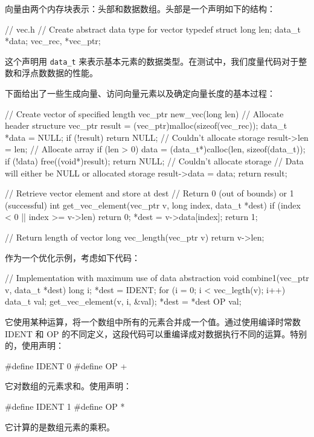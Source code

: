 向量由两个内存块表示：头部和数据数组。头部是一个声明如下的结构：

\begin{cppcode}
// vec.h
// Create abstract data type for vector
typedef struct {
  long len;
  data_t *data;
} vec_rec, *vec_ptr;
\end{cppcode}

这个声明用 \verb|data_t| 来表示基本元素的数据类型。在测试中，我们度量代码对于整数和浮点数数据的性能。

下面给出了一些生成向量、访问向量元素以及确定向量长度的基本过程：

\begin{cppcode}
// Create vector of specified length
vec_ptr new_vec(long len) {
  // Allocate header structure
  vec_ptr result = (vec_ptr)malloc(sizeof(vec_rec));
  data_t *data = NULL;
  if (!result) return NULL; // Couldn't allocate storage
  result->len = len;
  // Allocate array
  if (len > 0) {
    data = (data_t*)calloc(len, sizeof(data_t));
    if (!data) {
      free((void*)result);
      return NULL; // Couldn't allocate storage
    }
  }
  // Data will either be NULL or allocated storage
  result->data = data;
  return result;
}

// Retrieve vector element and store at dest
// Return 0 (out of bounds) or 1 (successful)
int get_vec_element(vec_ptr v, long index, data_t *dest) {
  if (index < 0 || index >= v->len) return 0;
  *dest = v->data[index];
  return 1;
}

// Return length of vector
long vec_length(vec_ptr v) {
  return v->len;
}
\end{cppcode}

作为一个优化示例，考虑如下代码：

\begin{cppcode}
// Implementation with maximum use of data abstraction
void combine1(vec_ptr v, data_t *dest) {
  long i;
  *dest = IDENT;
  for (i = 0; i < vec_legth(v); i++) {
    data_t val;
    get_vec_element(v, i, &val);
    *dest = *dest OP val;
  }
}
\end{cppcode}

它使用某种运算，将一个数组中所有的元素合并成一个值。通过使用编译时常数 IDENT 和 OP 的不同定义，这段代码可以重编译成对数据执行不同的运算。特别的，使用声明：
\begin{cppcode}
#define IDENT 0
#define OP +
\end{cppcode}
它对数组的元素求和。使用声明：
\begin{cppcode}
#define IDENT 1
#define OP *
\end{cppcode}
它计算的是数组元素的乘积。

